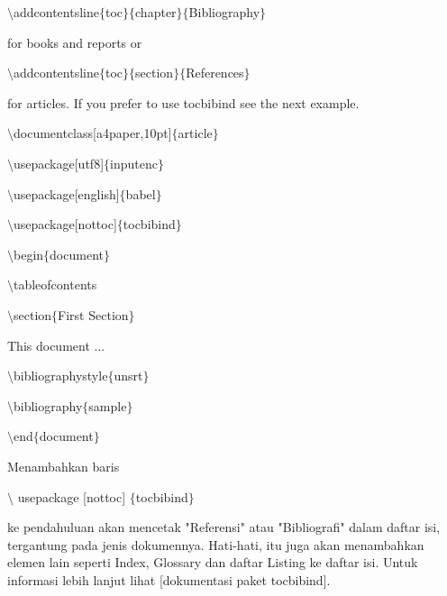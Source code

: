 \begin{itemize}
$\setminus$addcontentsline$ \{ $toc$ \} $$ \{ $chapter$ \} $$ \{ $Bibliography$ \} $\par

for books and reports or\par

$\setminus$addcontentsline$ \{ $toc$ \} $$ \{ $section$ \} $$ \{ $References$ \} $\par

for articles. If you prefer to use tocbibind see the next example.\par

$\setminus$documentclass[a4paper,10pt]$ \{ $article$ \} $\par

$\setminus$usepackage[utf8]$ \{ $inputenc$ \} $\par

$\setminus$usepackage[english]$ \{ $babel$ \} $\par

$\setminus$usepackage[nottoc]$ \{ $tocbibind$ \} $\par

$\setminus$begin$ \{ $document$ \} $\par

$\setminus$tableofcontents\par

$\setminus$section$ \{ $First Section$ \} $\par

This document ...\par

$\setminus$bibliographystyle$ \{ $unsrt$ \} $\par

$\setminus$bibliography$ \{ $sample$ \} $\par

$\setminus$end$ \{ $document$ \} $\par

Menambahkan baris\par

$\setminus$ usepackage [nottoc] $ \{ $tocbibind$ \} $\par

ke pendahuluan akan mencetak "Referensi" atau "Bibliografi" dalam daftar isi, tergantung pada jenis dokumennya. Hati-hati, itu juga akan menambahkan elemen lain seperti Index, Glossary dan daftar Listing ke daftar isi. Untuk informasi lebih lanjut lihat [dokumentasi paket tocbibind].\par


\end{itemize}
